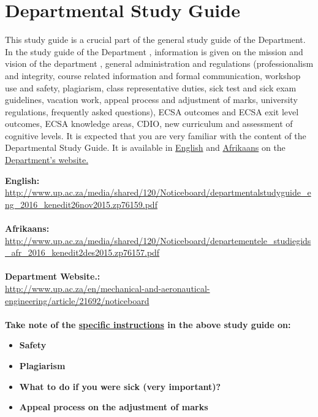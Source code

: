 \section{Departmental Study Guide} \label{sec:dep_study_guide}
    This study guide is a crucial part of the general study guide of the
    Department. In the study guide of the Department , information is given
    on the mission and vision of the department , general administration and
    regulations (professionalism and integrity, course related information
    and formal communication, workshop use and safety, plagiarism, class
    representative duties, sick test and sick exam guidelines, vacation work,
    appeal process and adjustment of marks, university regulations, frequently
    asked questions), ECSA outcomes and ECSA exit level outcomes, ECSA
    knowledge areas, CDIO, new curriculum and assessment of cognitive levels.
    It is expected that you are very familiar with the content of the
    Departmental Study Guide. It is available in
    \href{http://www.up.ac.za/media/shared/120/Noticeboard/Study Guides/departmentalstudyguide_eng_2015.zp40263.pdf}{English}
    and
    \href{http://www.up.ac.za/media/shared/120/Noticeboard/Study Guides/departementele_studiegids_afr_2015.zp40261.pdf}{Afrikaans}
    on the
    \href{http://www.up.ac.za/en/mechanical-and-aeronautical-engineering/article/21692/noticeboard}{Department’s website.}

    \noindent
    \textbf{English:} \\
    \url{http://www.up.ac.za/media/shared/120/Noticeboard/departmentalstudyguide_eng_2016_kenedit26nov2015.zp76159.pdf} \\~\\
    \textbf{Afrikaans:} \\
    \url{http://www.up.ac.za/media/shared/120/Noticeboard/departementele_studiegids_afr_2016_kenedit2des2015.zp76157.pdf} \\~\\
    \textbf{Department Website.:} \\
    \url{http://www.up.ac.za/en/mechanical-and-aeronautical-engineering/article/21692/noticeboard} \\~\\

    \noindent
    \textbf{Take note of the \uline{specific instructions} in the above study guide on:}
    \begin{itemize}
        \item \textbf{Safety}
        \item \textbf{Plagiarism}
        \item \textbf{What to do if you were sick (very important)?}
        \item \textbf{Appeal process on the adjustment of marks}
    \end{itemize}
